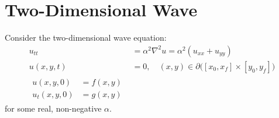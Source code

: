 \section*{Two-Dimensional Wave}

Consider the two-dimensional wave equation:
\begin{align}
\label{waveeqn:eqn:2d-wave-eqn}
u_{tt} &= \alpha^2 \nabla^2 u = \alpha^2 (u_{xx} + u_{yy}) \\
\label{waveeqn:eqn:2d-wave-eqn-boundary-conditions}
u(x, y, t) &= 0, \quad (x, y) \in \partial \big([x_0, x_f] \times [y_0, y_f]\big) \\
\begin{split}
	\label{waveeqn:eqn:2d-wave-eqn-initial-conditions}
	u(x, y, 0) &= f(x, y) \\
	u_t(x, y, 0) &= g(x, y)
\end{split}
\end{align}
for some real, non-negative $\alpha$.

